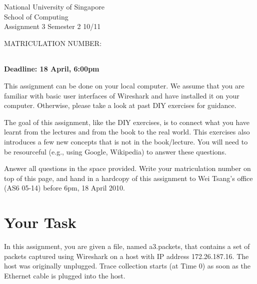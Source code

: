 \documentclass[a4paper,11pt,addpoints]{exam}
\begin{document}
\extraheadheight{.5in}
%
{\large\sf National University of Singapore\\ School of Computing \\
\LARGE\sf Assignment 3}%
{\large\sf Semester 2 10/11}
\firstpageheadrule
\pagestyle{headandfoot}

\begin{center}
{\Large{\sf MATRICULATION NUMBER:}}
\begin{tabular}{| c | c | c | c | c | c | c | c | c |}
\hline
\hspace{.3cm} &
\hspace{.3cm} &
\hspace{.3cm} &
\hspace{.3cm} &
\hspace{.3cm} &
\hspace{.3cm} &
\hspace{.3cm} &
\hspace{.3cm} &
\hspace{.3cm} \\[11pt]
\hline
\end{tabular}
\end{center}

\textbf{Deadline: 18 April, 6:00pm}

This assignment can be done on your local computer.  We assume that you are familiar with basic user interfaces of Wireshark and have installed it on your computer.  Otherwise, please take a look at past DIY exercises for guidance.

The goal of this assignment, like the DIY exercises, is to connect what you have learnt from the lectures and from the book to the real world.  This exercises also introduces a few new concepts that is not in the book/lecture.  You will need to be resourceful (e.g., using Google, Wikipedia) to answer these questions.

Answer all questions in the space provided.  Write your matriculation number on top of this page, and hand in a hardcopy of this assignment to Wei Tsang's office (AS6 05-14) before 6pm, 18 April 2010.

\section*{Your Task}

In this assignment, you are given a file, named a3.packets, that contains a set of packets captured using Wireshark on a host with IP address 172.26.187.16.  The host was originally unplugged.  Trace collection starts (at Time 0) as soon as the Ethernet cable is plugged into the host.  
\end{document}
